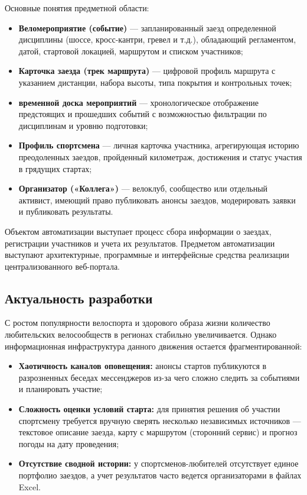 \documentclass[oneside,a4paper,14pt]{extarticle}
\begin{document}
Основные понятия предметной области:
\begin{itemize}
	\item \textbf{Веломероприятие (событие)} — запланированный заезд определенной дисциплины (шоссе, кросс-кантри, гревел и т.д.), обладающий регламентом, датой, стартовой локацией, маршрутом и списком участников;
	\item \textbf{Карточка заезда (трек маршрута)} — цифровой профиль маршрута с указанием дистанции, набора высоты, типа покрытия и контрольных точек;
	\item \textbf{временной доска мероприятий} — хронологическое отображение предстоящих и прошедших событий с возможностью фильтрации по дисциплинам и уровню подготовки;
	\item \textbf{Профиль спортсмена} — личная карточка участника, агрегирующая историю преодоленных заездов, пройденный километраж, достижения и статус участия в грядущих стартах;
	\item \textbf{Организатор («Коллега»)} — велоклуб, сообщество или отдельный активист, имеющий право публиковать анонсы заездов, модерировать заявки и публиковать результаты.
\end{itemize}

Объектом автоматизации выступает процесс сбора информации о заездах, регистрации участников и учета их результатов. Предметом автоматизации выступают архитектурные, программные и интерфейсные средства реализации централизованного веб-портала.

\subsection{Актуальность разработки}

С ростом популярности велоспорта и здорового образа жизни количество любительских велосообществ в регионах стабильно увеличивается. Однако информационная инфраструктура данного движения остается фрагментированной:
\begin{itemize}
	\item \textbf{Хаотичность каналов оповещения:} анонсы стартов публикуются в разрозненных беседах мессенджеров из-за чего сложно следить за событиями и планировать участие;
	\item \textbf{Сложность оценки условий старта:} для принятия решения об участии спортсмену требуется вручную сверять несколько независимых источников — текстовое описание заезда, карту с маршрутом (сторонний сервис) и прогноз погоды на дату проведения;
	\item \textbf{Отсутствие сводной истории:} у спортсменов-любителей отсутствует единое портфолио заездов, а учет результатов часто ведется организаторами в файлах Excel.
\end{itemize}
\end{document}
